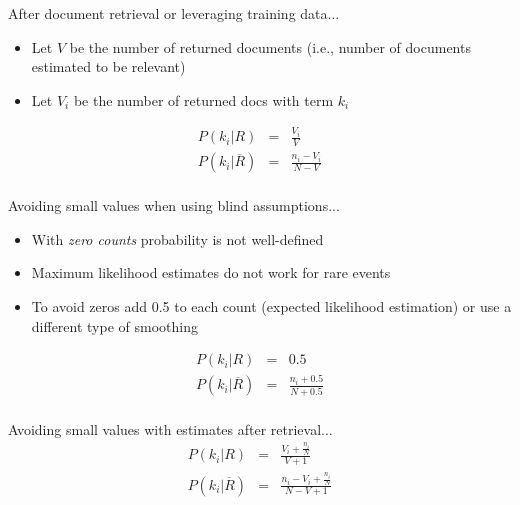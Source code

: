 \documentclass[svgnames]{beamer}
\begin{document}
\begin{frame}[allowframebreaks]
  \begin{block}{After document retrieval or leveraging training data...}
    \begin{itemize}
    \item Let $V$ be the number of returned documents (i.e., number of documents estimated to be relevant)
    \item Let $V_i$ be the number of returned docs with term $k_i$
    \end{itemize}
    \begin{displaymath}
      \begin{array}{rcl}
        P(k_i|R) &=& \frac{V_i}{V}\\
        P(k_i|\overline{R}) &=& \frac{n_i - V_i}{N - V}\\
      \end{array}
    \end{displaymath}    
  \end{block}
  
  \begin{block}{Avoiding small values when using blind assumptions...}
    \begin{itemize}
    \item With \emph{zero counts} probability is not well-defined
    \item Maximum likelihood estimates do not work for rare events
    \item To avoid zeros add 0.5 to each count (expected likelihood estimation) or use a different type of smoothing
    \end{itemize}
    \begin{displaymath}
      \begin{array}{rcl}
        P(k_i|R) &=& 0.5\\
        P(k_i|\overline{R}) &=& \frac{n_i + 0.5}{N + 0.5}\\
      \end{array}
    \end{displaymath}   
  \end{block}
  
  \begin{block}{Avoiding small values with estimates after retrieval...}
    \begin{displaymath}
      \begin{array}{rcl}
        P(k_i|R) &=& \frac{V_i + \frac{n_i}{N}}{V + 1}\\
        P(k_i|\overline{R}) &=& \frac{n_i - V_i + \frac{n_i}{N}}{N - V + 1}\\
      \end{array}
    \end{displaymath}    
  \end{block}
\end{frame}
\end{document}

